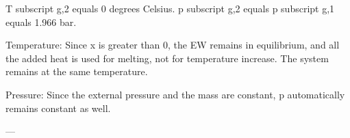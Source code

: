 T subscript g,2 equals 0 degrees Celsius.  
p subscript g,2 equals p subscript g,1 equals 1.966 bar.  

Temperature:  
Since x is greater than 0, the EW remains in equilibrium, and all the added heat is used for melting, not for temperature increase. The system remains at the same temperature.  

Pressure:  
Since the external pressure and the mass are constant, p automatically remains constant as well.  

---